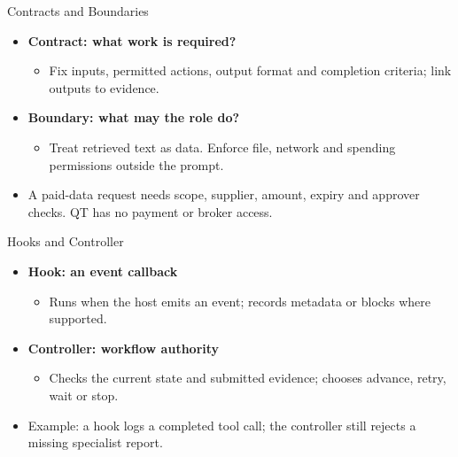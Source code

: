 \begin{frame}{Contracts and Boundaries}
\begin{center}
\resizebox{.82\textwidth}{!}{}
\end{center}
\begin{itemize}
\item \textbf{Contract: what work is required?}
\begin{itemize}
\item Fix inputs, permitted actions, output format and completion criteria; link outputs to evidence.
\end{itemize}
\item \textbf{Boundary: what may the role do?}
\begin{itemize}
\item Treat retrieved text as data. Enforce file, network and spending permissions outside the prompt.
\end{itemize}
\item A paid-data request needs scope, supplier, amount, expiry and approver checks. QT has no payment or broker access.
\end{itemize}
\end{frame}

\begin{frame}{Hooks and Controller}
\begin{center}
\resizebox{.82\textwidth}{!}{}
\end{center}
\begin{itemize}
\item \textbf{Hook: an event callback}
\begin{itemize}
\item Runs when the host emits an event; records metadata or blocks where supported.
\end{itemize}
\item \textbf{Controller: workflow authority}
\begin{itemize}
\item Checks the current state and submitted evidence; chooses advance, retry, wait or stop.
\end{itemize}
\item Example: a hook logs a completed tool call; the controller still rejects a missing specialist report.
\end{itemize}
\end{frame}

